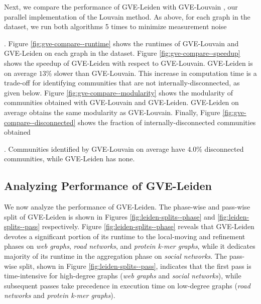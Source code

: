 



Next, we compare the performance of GVE-Leiden with GVE-Louvain \cite{sahu2023gvelouvain}, our parallel implementation of the Louvain method. As above, for each graph in the dataset, we run both algorithms 5 times to minimize measurement noise. Figure \ref{fig:gve-compare--runtime} shows the runtimes of GVE-Louvain and GVE-Leiden on each graph in the dataset. Figure \ref{fig:gve-compare--speedup} shows the speedup of GVE-Leiden with respect to GVE-Louvain. GVE-Leiden is on average $13\%$ slower than GVE-Louvain. This increase in computation time is a trade-off for identifying communities that are not internally-disconnected, as given below. Figure \ref{fig:gve-compare--modularity} shows the modularity of communities obtained with GVE-Louvain and GVE-Leiden. GVE-Leiden on average obtains the same modularity as GVE-Louvain. Finally, Figure \ref{fig:gve-compare--disconnected} shows the fraction of internally-disconnected communities obtained. Communities identified by GVE-Louvain on average have $4.0\%$ disconnected communities, while GVE-Leiden has none.




\subsection{Analyzing Performance of GVE-Leiden}

We now analyze the performance of GVE-Leiden. The phase-wise and pass-wise split of GVE-Leiden is shown in Figures \ref{fig:leiden-splits--phase} and \ref{fig:leiden-splits--pass} respectively. Figure \ref{fig:leiden-splits--phase} reveals that GVE-Leiden devotes a significant portion of its runtime to the local-moving and refinement phases on \textit{web graphs}, \textit{road networks}, and \textit{protein k-mer graphs}, while it dedicates majority of its runtime in the aggregation phase on \textit{social networks}. The pass-wise split, shown in Figure \ref{fig:leiden-splits--pass}, indicates that the first pass is time-intensive for high-degree graphs (\textit{web graphs} and \textit{social networks}), while subsequent passes take precedence in execution time on low-degree graphs (\textit{road networks} and \textit{protein k-mer graphs}).

